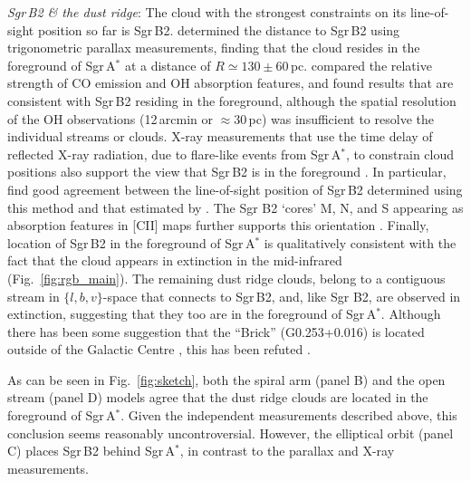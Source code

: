 \noindent\emph{Sgr\,B2 \& the dust ridge}: The cloud with the strongest constraints on its line-of-sight position so far is Sgr\,B2.
\citet{Reid2009} determined the distance to Sgr\,B2 using trigonometric parallax measurements, finding that the cloud resides in the foreground of Sgr\,A$^{*}$ at a distance of $R\simeq130\pm60$\,pc. 
\citet[][see also \citealp{Yan2017}]{Sawada2004} compared the relative strength of CO emission and OH absorption features, and found results that are consistent with Sgr\,B2 residing in the foreground, although the spatial resolution of the OH observations (12\,arcmin or $\approx30$\,pc) was insufficient to resolve the individual streams or clouds.
X-ray measurements that use the time delay of reflected X-ray radiation, due to flare-like events from Sgr\,A$^{*}$, to constrain cloud positions also support the view that Sgr\,B2 is in the foreground \citep{Ponti2010,Clavel2013,Walls2016, Churazov2017a, Churazov2017b, Chuard2018, Terrier2018}.
In particular, \citet{Chuard2018} find good agreement between the line-of-sight position of Sgr\,B2 determined using this method and that estimated by \citet{Reid2009}.
The Sgr B2 `cores' M, N, and S appearing as absorption features in [CII] maps further supports this orientation \citep{Harris2021}.
Finally, location of Sgr\,B2 in the foreground of Sgr\,A$^{*}$ is qualitatively consistent with the fact that the cloud appears in extinction in the mid-infrared (Fig.~\ref{fig:rgb_main}).
The remaining dust ridge clouds, belong to a contiguous stream in $\{l,b,v\}$-space that connects to Sgr\,B2, and, like Sgr B2, are observed in extinction, suggesting that they too are in the foreground of Sgr\,A$^{*}$. Although there has been some suggestion that the ``Brick'' (G0.253+0.016) is located outside of the Galactic Centre \citep{Zoccali2021}, this has been refuted \citep{Nogueras-Lara2021}.

As can be seen in Fig.~\ref{fig:sketch}, both the spiral arm (panel B) and the open stream (panel D) models agree that the dust ridge clouds are located in the foreground of Sgr\,A$^{*}$. 
Given the independent measurements described above, this conclusion seems reasonably uncontroversial. 
However, the elliptical orbit (panel C) places Sgr\,B2 behind Sgr\,A$^{*}$, in contrast to the parallax and X-ray measurements.
\medskip 

